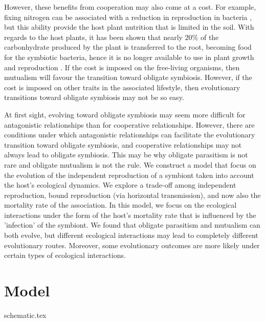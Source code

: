 \documentclass[11.5pt]{article}
\begin{document}
\medskip

However, these benefits from cooperation may also come at a cost. For example, fixing nitrogen can be associated with a reduction in reproduction in bacteria \parencite{Inomura2017}, but this ability provide the host plant nutrition that is limited in the soil. With regards to the host plants, it has been shown that nearly 20\% of the carbonhydrate produced by the plant is transferred to the root, becoming food for the symbiotic bacteria, hence it is no longer available to use in plant growth and reproduction \parencite{Hinsinger2005}. If the cost is imposed on the free-living organisms, then mutualism will favour the transition toward obligate symbiosis. However, if the cost is imposed on other traits in the associated lifestyle, then evolutionary transitions toward obligate symbiosis may not be so easy.

\medskip

At first sight, evolving toward obligate symbiosis may seem more difficult for antagonistic relationships than for cooperative relationships. However, there are conditions under which antagonistic relationships can facilitate the evolutionary transition toward obligate symbiosis, and cooperative relationships may not always lead to obligate symbiosis. This may be why obligate parasitism is not rare and obligate mutualism is not the rule. We construct a model that focus on the evolution of the independent reproduction of a symbiont taken into account the host's ecological dynamics. We explore a trade-off among independent reproduction, bound reproduction (via horizontal transmission), and now also the mortality rate of the association. In this model, we focus on the ecological interactions under the form of the host's mortality rate that is influenced by the 'infection' of the symbiont. We found that obligate parasitism and mutualism can both evolve, but different ecological interactions may lead to completely different evolutionary routes. Moreover, some evolutionary outcomes are more likely under certain types of ecological interactions.


\section{Model}

{schematic.tex}
\end{document}

